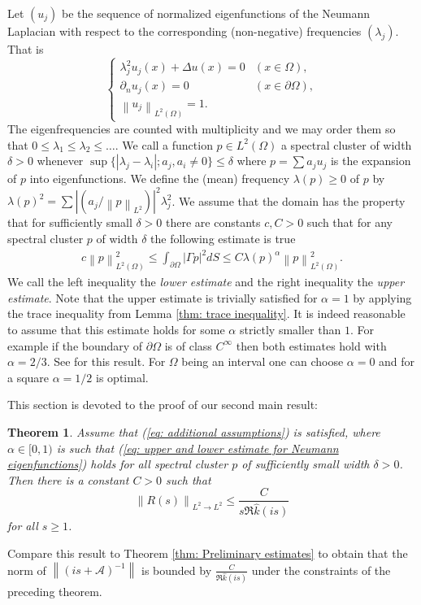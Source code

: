 \documentclass{amsart}
\newcommand{\abs}[1]{\left|#1\right|}
\newcommand{\norm}[1]{\left\| #1 \right\|}
\newcommand{\A}{\mathcal{A}}
\newcommand{\khat}{\hat{k}}
\newtheorem{Theorem}{Theorem}
\begin{document}
Let $(u_j)$ be the sequence of normalized eigenfunctions of the Neumann Laplacian with respect to the corresponding (non-negative) frequencies $(\lambda_j)$. That is
\begin{equation}\label{eq: Neumann eigenvalue problem}
 \begin{cases}
   \lambda_j^2u_j(x) + \Delta u(x) = 0 & (x\in\Omega), \\
   \partial_n u_j(x) = 0 &  (x\in\partial\Omega), \\
   \norm{u_j}_{L^2(\Omega)} = 1 .
 \end{cases}
\end{equation}
The eigenfrequencies are counted with multiplicity and we may order them so that $0\leq \lambda_1 \leq \lambda_2 \leq \ldots$. We call a function $p\in L^2(\Omega)$ a spectral cluster of width $\delta>0$ whenever $\sup\{\abs{\lambda_j-\lambda_i}; a_j, a_i \neq 0\}\leq \delta$ where $p=\sum a_j u_j$ is the expansion of $p$ into eigenfunctions. We define the (mean) frequency $\lambda(p)\geq0$ of $p$ by $\lambda(p)^2=\sum \abs{(a_j/\norm{p}_{L^2})}^2\lambda_j^2$. We assume that the domain has the property that for sufficiently small $\delta>0$ there are constants $c,C>0$ such that for any spectral cluster $p$ of width $\delta$ the following estimate is true
\begin{align}\label{eq: upper and lower estimate for Neumann eigenfunctions}
 c\norm{p}_{L^2(\Omega)}^2 \leq \int_{\partial\Omega} \abs{\Gamma p}^2 dS \leq C \lambda(p)^{\alpha} \norm{p}_{L^2(\Omega)}^2 .
\end{align}
We call the left inequality the \emph{lower estimate} and the right inequality the \emph{upper estimate}. Note that the upper estimate is trivially satisfied for $\alpha=1$ by applying the trace inequality from Lemma \ref{thm: trace inequality}. It is indeed reasonable to assume that this estimate holds for some $\alpha$ strictly smaller than $1$. For example if the boundary of $\partial\Omega$ is of class $C^{\infty}$ then both estimates hold with $\alpha=2/3$. See \cite{BarnettHassellTacy2016} for this result. For $\Omega$ being an interval one can choose $\alpha=0$ and for a square $\alpha=1/2$ is optimal. 

This section is devoted to the proof of our second main result:

\begin{Theorem}\label{thm: upper resolvent estimate}
 Assume that (\ref{eq: additional assumptions}) is satisfied, where $\alpha\in[0,1)$ is such that (\ref{eq: upper and lower estimate for Neumann eigenfunctions}) holds for all spectral cluster $p$ of sufficiently small width $\delta>0$. Then there is a constant $C>0$ such that
 \begin{equation}\nonumber
  \norm{R(s)}_{L^2\rightarrow L^2} \leq \frac{C}{s\Re\khat(is)}
 \end{equation}
 for all $s\geq 1$.
\end{Theorem}
Compare this result to Theorem \ref{thm: Preliminary estimates} to obtain that the norm of $\norm{(is+\A)^{-1}}$ is bounded by $\frac{C}{\Re\khat(is)}$ under the constraints of the preceding theorem.
\end{document}
